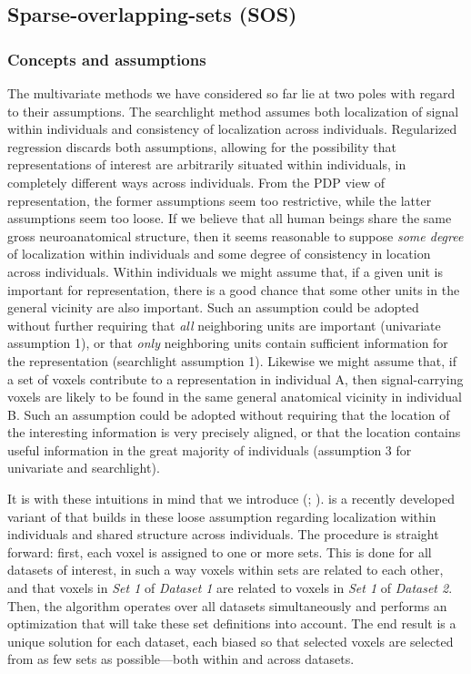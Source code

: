 \subsection{Sparse-overlapping-sets (SOS) {\lasso}}
\subsubsection{Concepts and assumptions}
The multivariate methods we have considered so far lie at two poles with regard to their assumptions. The searchlight method assumes both localization of signal within individuals and consistency of localization across individuals. Regularized regression discards both assumptions, allowing for the possibility that representations of interest are arbitrarily situated within individuals, in completely different ways across individuals. From the PDP view of representation, the former assumptions seem too restrictive, while the latter assumptions seem too loose. If we believe that all human beings share the same gross neuroanatomical structure, then it seems reasonable to suppose {\em some degree} of localization within individuals and some degree of consistency in location across individuals. Within individuals we might assume that, if a given unit is important for representation, there is a good chance that some other units in the general vicinity are also important. Such an assumption could be adopted without further requiring that {\em all} neighboring units are important (univariate assumption 1), or that {\em only} neighboring units contain sufficient information for the representation (searchlight assumption 1). Likewise we might assume that, if a set of voxels contribute to a representation in individual A, then signal-carrying voxels are likely to be found in the same general anatomical vicinity in individual B. Such an assumption could be adopted without requiring that the location of the interesting information is very precisely aligned, or that the location contains useful information in the great majority of individuals (assumption 3 for univariate and searchlight).

It is with these intuitions in mind that we introduce {\soslasso} ({\soslassofull}; ). {\soslasso} is a recently developed variant of {\lasso} that builds in these loose assumption regarding localization within individuals and shared structure across individuals. The procedure is straight forward: first, each voxel is assigned to one or more sets. This is done for all datasets of interest, in such a way voxels within sets are related to each other, and that voxels in {\em Set 1} of {\em Dataset 1} are related to voxels in {\em Set 1} of {\em Dataset 2}. Then, the algorithm operates over all datasets simultaneously and performs an optimization that will take these set definitions into account. The end result is a unique solution for each dataset, each biased so that selected voxels are selected from as few sets as possible---both within and across datasets. 

